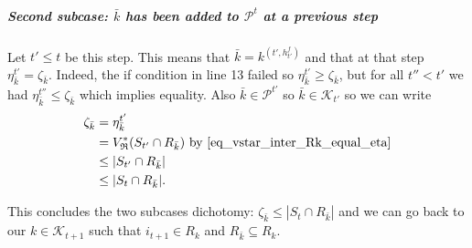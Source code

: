 \documentclass[
  11pt,
  a4paper,
]{article}
\let\oldsubparagraph\subparagraph
\renewcommand{\subparagraph}[1]{\oldsubparagraph{#1}\mbox{}}
\theoremstyle{plain}
\theoremstyle{plain}
\theoremstyle{plain}
\theoremstyle{definition}
\theoremstyle{definition}
\theoremstyle{remark}
\begin{document}
\subparagraph{\texorpdfstring{Second subcase: \(\bar k\) has been added
to \(\mathcal{P}^t\) at a previous
step}{Second subcase: \textbackslash bar k has been added to \textbackslash mathcal\{P\}\^{}t at a previous step}}\label{second-subcase-bar-k-has-been-added-to-mathcalpt-at-a-previous-step}

Let \(t'\leq t\) be this step. This means that
\(\bar k = k^{(t',h^f_{t'})}\) and that at that step
\(\eta^{t'}_{\bar k}=\zeta_{\bar k}\). Indeed, the if condition in line
13 failed so \(\eta^{t'}_{\bar k}\geq\zeta_{\bar k}\), but for all
\(t''<t'\) we had \(\eta^{t''}_{\bar k}\leq\zeta_{\bar k}\) which
implies equality. Also \(\bar k\in \mathcal{P}^{t'}\) so
\(\bar k\in \mathcal{K}_{t'}\) so we can write \begin{align*}
\zeta_{\bar k}&=\eta^{t'}_{\bar k}\\
&=V^*_{\mathfrak{R}}(S_{t'}\cap R_{\bar k})  \text{ by~\eqref{eq_vstar_inter_Rk_equal_eta}} \\
&\leq | S_{t'}\cap R_{\bar k} |\\
&\leq  | S_{t}\cap R_{\bar k} |.\\
\end{align*}

This concludes the two subcases dichotomy:
\(\zeta_{\bar k}\leq |S_t\cap R_{\bar k}|\) and we can go back to our
\(k\in\mathcal{K}_{t+1}\) such that \(i_{t+1}\in R_k\) and
\(R_{\bar k}\subseteq R_k\).
\end{document}
